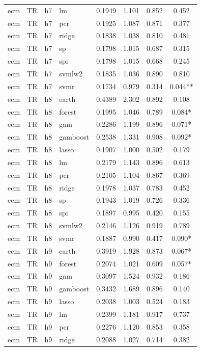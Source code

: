 \begin{ThreePartTable}
\begin{longtable}[t]{llclcccc}
ecm & TR & h7 & lm & 0.1949 & 1.101 & 0.852 & 0.452\\
ecm & TR & h7 & pcr & 0.1925 & 1.087 & 0.871 & 0.377\\
ecm & TR & h7 & ridge & 0.1838 & 1.038 & 0.810 & 0.481\\
ecm & TR & h7 & sp & 0.1798 & 1.015 & 0.687 & 0.315\\
ecm & TR & h7 & spi & 0.1798 & 1.015 & 0.668 & 0.245\\
ecm & TR & h7 & svmlw2 & 0.1835 & 1.036 & 0.890 & 0.810\\
ecm & TR & h7 & svmr & 0.1734 & 0.979 & 0.314 & 0.044**\\
\addlinespace
ecm & TR & h8 & earth & 0.4389 & 2.302 & 0.892 & 0.108\\
ecm & TR & h8 & forest & 0.1995 & 1.046 & 0.789 & 0.084*\\
ecm & TR & h8 & gam & 0.2286 & 1.199 & 0.896 & 0.071*\\
ecm & TR & h8 & gamboost & 0.2538 & 1.331 & 0.908 & 0.092*\\
ecm & TR & h8 & lasso & 0.1907 & 1.000 & 0.502 & 0.179\\
ecm & TR & h8 & lm & 0.2179 & 1.143 & 0.896 & 0.613\\
ecm & TR & h8 & pcr & 0.2105 & 1.104 & 0.867 & 0.369\\
ecm & TR & h8 & ridge & 0.1978 & 1.037 & 0.783 & 0.452\\
ecm & TR & h8 & sp & 0.1943 & 1.019 & 0.726 & 0.336\\
ecm & TR & h8 & spi & 0.1897 & 0.995 & 0.420 & 0.155\\
ecm & TR & h8 & svmlw2 & 0.2146 & 1.126 & 0.919 & 0.789\\
ecm & TR & h8 & svmr & 0.1887 & 0.990 & 0.417 & 0.090*\\
\addlinespace
ecm & TR & h9 & earth & 0.3919 & 1.928 & 0.873 & 0.067*\\
ecm & TR & h9 & forest & 0.2074 & 1.021 & 0.609 & 0.057*\\
ecm & TR & h9 & gam & 0.3097 & 1.524 & 0.932 & 0.186\\
ecm & TR & h9 & gamboost & 0.3432 & 1.689 & 0.896 & 0.140\\
ecm & TR & h9 & lasso & 0.2038 & 1.003 & 0.524 & 0.183\\
ecm & TR & h9 & lm & 0.2399 & 1.181 & 0.917 & 0.737\\
ecm & TR & h9 & pcr & 0.2276 & 1.120 & 0.853 & 0.358\\
ecm & TR & h9 & ridge & 0.2088 & 1.027 & 0.714 & 0.382\\

\end{longtable}
\end{ThreePartTable}
